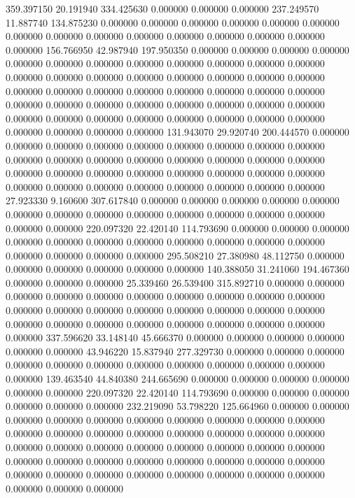 359.397150 20.191940 334.425630
0.000000 0.000000 0.000000
237.249570 11.887740 134.875230
0.000000 0.000000 0.000000
0.000000 0.000000 0.000000
0.000000 0.000000 0.000000
0.000000 0.000000 0.000000
0.000000 0.000000 0.000000
156.766950 42.987940 197.950350
0.000000 0.000000 0.000000
0.000000 0.000000 0.000000
0.000000 0.000000 0.000000
0.000000 0.000000 0.000000
0.000000 0.000000 0.000000
0.000000 0.000000 0.000000
0.000000 0.000000 0.000000
0.000000 0.000000 0.000000
0.000000 0.000000 0.000000
0.000000 0.000000 0.000000
0.000000 0.000000 0.000000
0.000000 0.000000 0.000000
0.000000 0.000000 0.000000
0.000000 0.000000 0.000000
0.000000 0.000000 0.000000
0.000000 0.000000 0.000000
131.943070 29.920740 200.444570
0.000000 0.000000 0.000000
0.000000 0.000000 0.000000
0.000000 0.000000 0.000000
0.000000 0.000000 0.000000
0.000000 0.000000 0.000000
0.000000 0.000000 0.000000
0.000000 0.000000 0.000000
0.000000 0.000000 0.000000
0.000000 0.000000 0.000000
0.000000 0.000000 0.000000
0.000000 0.000000 0.000000
27.923330 9.160600 307.617840
0.000000 0.000000 0.000000
0.000000 0.000000 0.000000
0.000000 0.000000 0.000000
0.000000 0.000000 0.000000
0.000000 0.000000 0.000000
220.097320 22.420140 114.793690
0.000000 0.000000 0.000000
0.000000 0.000000 0.000000
0.000000 0.000000 0.000000
0.000000 0.000000 0.000000
0.000000 0.000000 0.000000
295.508210 27.380980 48.112750
0.000000 0.000000 0.000000
0.000000 0.000000 0.000000
140.388050 31.241060 194.467360
0.000000 0.000000 0.000000
25.339460 26.539400 315.892710
0.000000 0.000000 0.000000
0.000000 0.000000 0.000000
0.000000 0.000000 0.000000
0.000000 0.000000 0.000000
0.000000 0.000000 0.000000
0.000000 0.000000 0.000000
0.000000 0.000000 0.000000
0.000000 0.000000 0.000000
0.000000 0.000000 0.000000
337.596620 33.148140 45.666370
0.000000 0.000000 0.000000
0.000000 0.000000 0.000000
43.946220 15.837940 277.329730
0.000000 0.000000 0.000000
0.000000 0.000000 0.000000
0.000000 0.000000 0.000000
0.000000 0.000000 0.000000
139.463540 44.840380 244.665690
0.000000 0.000000 0.000000
0.000000 0.000000 0.000000
220.097320 22.420140 114.793690
0.000000 0.000000 0.000000
0.000000 0.000000 0.000000
232.219090 53.798220 125.664960
0.000000 0.000000 0.000000
0.000000 0.000000 0.000000
0.000000 0.000000 0.000000
0.000000 0.000000 0.000000
0.000000 0.000000 0.000000
0.000000 0.000000 0.000000
0.000000 0.000000 0.000000
0.000000 0.000000 0.000000
0.000000 0.000000 0.000000
0.000000 0.000000 0.000000
0.000000 0.000000 0.000000
0.000000 0.000000 0.000000
0.000000 0.000000 0.000000
0.000000 0.000000 0.000000
0.000000 0.000000 0.000000
